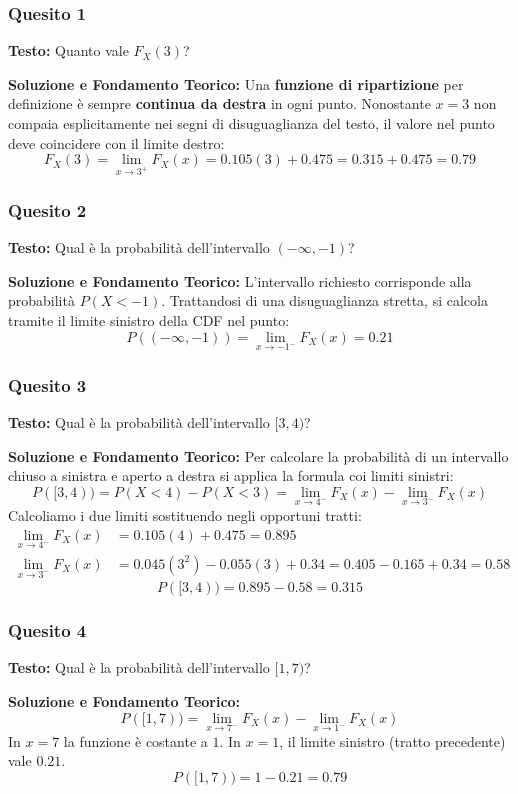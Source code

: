 \documentclass[12pt, a4paper]{article}
\begin{document}
\subsubsection*{Quesito 1}
\textbf{Testo:} Quanto vale $F_X(3)$?

\textbf{Soluzione e Fondamento Teorico:} 
Una \textbf{funzione di ripartizione} per definizione è sempre \textbf{continua da destra} in ogni punto. Nonostante $x=3$ non compaia esplicitamente nei segni di disuguaglianza del testo, il valore nel punto deve coincidere con il limite destro:
$$ F_X(3) = \lim_{x \to 3^+} F_X(x) = 0.105(3) + 0.475 = 0.315 + 0.475 = 0.79 $$

\subsubsection*{Quesito 2}
\textbf{Testo:} Qual è la probabilità dell'intervallo $(-\infty, -1)$?

\textbf{Soluzione e Fondamento Teorico:} 
L'intervallo richiesto corrisponde alla probabilità $P(X < -1)$. Trattandosi di una disuguaglianza stretta, si calcola tramite il limite sinistro della CDF nel punto:
$$ P((-\infty, -1)) = \lim_{x \to -1^-} F_X(x) = 0.21 $$

\subsubsection*{Quesito 3}
\textbf{Testo:} Qual è la probabilità dell'intervallo $[3, 4)$?

\textbf{Soluzione e Fondamento Teorico:} 
Per calcolare la probabilità di un intervallo chiuso a sinistra e aperto a destra si applica la formula coi limiti sinistri:
$$ P([3, 4)) = P(X < 4) - P(X < 3) = \lim_{x \to 4^-} F_X(x) - \lim_{x \to 3^-} F_X(x) $$
Calcoliamo i due limiti sostituendo negli opportuni tratti:
\begin{align*}
\lim_{x \to 4^-} F_X(x) &= 0.105(4) + 0.475 = 0.895 \\
\lim_{x \to 3^-} F_X(x) &= 0.045(3^2) - 0.055(3) + 0.34 = 0.405 - 0.165 + 0.34 = 0.58
\end{align*}
$$ P([3, 4)) = 0.895 - 0.58 = 0.315 $$

\subsubsection*{Quesito 4}
\textbf{Testo:} Qual è la probabilità dell'intervallo $[1, 7)$?

\textbf{Soluzione e Fondamento Teorico:} 
$$ P([1, 7)) = \lim_{x \to 7^-} F_X(x) - \lim_{x \to 1^-} F_X(x) $$
In $x=7$ la funzione è costante a $1$. In $x=1$, il limite sinistro (tratto precedente) vale $0.21$.
$$ P([1, 7)) = 1 - 0.21 = 0.79 $$
\end{document}
